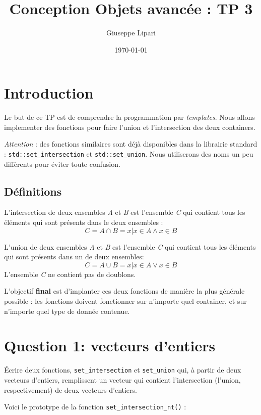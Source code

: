 \documentclass{article}
\author{Giuseppe Lipari}
\date{\today}
\title{Conception Objets avancée : TP 3}
\begin{document}
\maketitle

\section*{Introduction}
\label{sec:orgc2ed1f0}

Le but de ce TP est de comprendre la programmation par \emph{templates}.
Nous allons implementer des fonctions pour faire l'union et
l'intersection des deux containers.  

\emph{Attention} : des fonctions similaires sont déjà disponibles dans la
librairie standard : \texttt{std::set\_intersection} et
\texttt{std::set\_union}. Nous utiliserons des noms un peu différents pour
éviter toute confusion.


\subsection*{Définitions}
\label{sec:org7f24694}

L'intersection de deux ensembles \emph{A} et \emph{B} est l'ensemble \emph{C} qui
contient tous les éléments qui sont présents dans le deux ensembles :
\[
       C = A \cap B = { x | x \in A \wedge x \in B}
   \]

L'union de deux ensembles \emph{A} et \emph{B} est l'ensemble \emph{C} qui contient
tous les éléments qui sont présents dans un de deux ensembles:
\[
       C = A \cup B = { x | x \in A \vee x \in B}
   \]
L'ensemble \emph{C} ne contient pas de doublons.

L'objectif \textbf{final} est d'implanter ces deux fonctions de manière la
plus générale possible : les fonctions doivent fonctionner sur
n'importe quel container, et sur n'importe quel type de donnée
contenue.


\section*{Question 1: vecteurs d'entiers}
\label{sec:org25407f2}

Écrire deux fonctions, \texttt{set\_intersection} et \texttt{set\_union} qui, à
partir de deux vecteurs d'entiers, remplissent un vecteur qui
contient l'intersection (l'union, respectivement) de deux vecteurs
d'entiers.

Voici le prototype de la fonction \texttt{set\_intersection\_nt()} :
\end{document}
